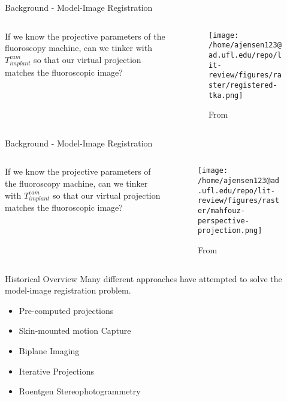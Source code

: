 \documentclass[presentation, aspectratio=1610]{beamer}
\begin{document}
\begin{frame}[label={sec:org96a56d7}]{Background - Model-Image Registration}
\begin{columns}
\begin{column}{0.5\columnwidth}
If we know the projective parameters of the fluoroscopy machine, can we tinker with \(T^{cam}_{implant}\) so that our virtual projection matches the fluoroscopic image?
\end{column}
\begin{column}{0.6\columnwidth}
\begin{figure}[htbp]
\centering
\texttt{[image: /home/ajensen123@ad.ufl.edu/repo/lit-review/figures/raster/registered-tka.png]}
\caption{From \autocite{mahfouzRobustMethodRegistration2003}}
\end{figure}
\end{column}
\end{columns}
\end{frame}
\begin{frame}[label={sec:org703a9ba}]{Background - Model-Image Registration}
\begin{columns}
\begin{column}{0.5\columnwidth}
If we know the projective parameters of the fluoroscopy machine, can we tinker with \(T^{cam}_{implant}\) so that our virtual projection matches the fluoroscopic image?
\end{column}
\begin{column}{0.6\columnwidth}
\begin{figure}[htbp]
\centering
\texttt{[image: /home/ajensen123@ad.ufl.edu/repo/lit-review/figures/raster/mahfouz-perspective-projection.png]}
\caption{From \autocite{mahfouzRobustMethodRegistration2003}}
\end{figure}
\end{column}
\end{columns}
\end{frame}
\begin{frame}[label={sec:org5d63555}]{Historical Overview}
Many different approaches have attempted to solve the model-image registration problem.
\begin{itemize}
\item Pre-computed projections
\item Skin-mounted motion Capture
\item Biplane Imaging
\item Iterative Projections
\item Roentgen Stereophotogrammetry
\end{itemize}
\end{frame}
\end{document}
